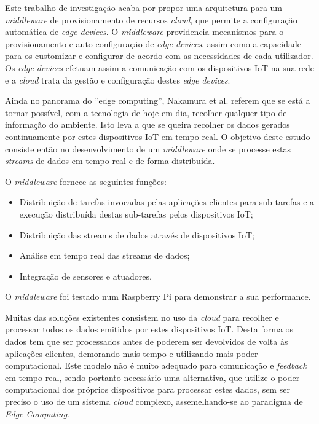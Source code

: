 Este trabalho de investigação acaba por propor uma arquitetura para um \textit{middleware} de provisionamento de recursos \textit{cloud}, que permite a configuração automática de \textit{edge devices}. O \textit{middleware} providencia mecanismos para o provisionamento e auto-configuração de \textit{edge devices}, assim como a capacidade para os customizar e configurar de acordo com as necessidades de cada utilizador. Os \textit{edge devices} efetuam assim a comunicação com os dispositivos IoT na sua rede e a \textit{cloud} trata da gestão e configuração destes \textit{edge devices}.


Ainda no panorama do ''edge computing'', Nakamura et al. \cite{iot-real-time} referem que se está a tornar possível, com a tecnologia de hoje em dia, recolher qualquer tipo de informação do ambiente. Isto leva a que se queira recolher os dados gerados continuamente por estes dispositivos IoT em tempo real. O objetivo deste estudo consiste então no desenvolvimento de um \textit{middleware} onde se processe estas \textit{streams} de dados em tempo real e de forma distribuída.

O \textit{middleware} fornece as seguintes funções:
\begin{itemize}
\item Distribuição de tarefas invocadas pelas aplicações clientes para sub-tarefas e a execução distribuída destas sub-tarefas pelos dispositivos IoT;
\item Distribuição das streams de dados através de dispositivos IoT;
\item Análise em tempo real das streams de dados;
\item Integração de sensores e atuadores.
\end{itemize}

O \textit{middleware} foi testado num Raspberry Pi para demonstrar a sua performance.

Muitas das soluções existentes consistem no uso da \textit{cloud} para recolher e processar todos os dados emitidos por estes dispositivos IoT. Desta forma os dados tem que ser processados antes de poderem ser devolvidos de volta às aplicações clientes, demorando mais tempo e utilizando mais poder computacional. Este modelo não é muito adequado para comunicação e \textit{feedback} em tempo real, sendo portanto necessário uma alternativa, que utilize o poder computacional dos próprios dispositivos para processar estes dados, sem ser preciso o uso de um sistema \textit{cloud} complexo, assemelhando-se ao paradigma de \textit{Edge Computing}.

